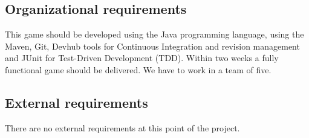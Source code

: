 \documentclass[a4paper]{article}
\begin{document}

\subsection{Organizational requirements}
This game should be developed using the Java programming language, using the Maven, Git, Devhub tools for Continuous Integration and revision management and JUnit for Test-Driven Development (TDD). Within two weeks a fully functional game should be delivered. We have to work in a team of five.

\subsection{External requirements}
There are no external requirements at this point of the project.





\pagebreak
\end{document}
